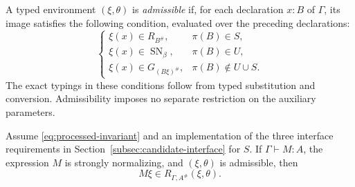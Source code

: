 A typed environment $(\xi,\theta)$ is \emph{admissible} if, for each
declaration $x:B$ of $\Gamma$, its image satisfies the following
condition, evaluated over the preceding declarations:
\[
 \begin{cases}
 \xi(x)\in R_{B^\#},&\pi(B)\in S,\\
 \xi(x)\in\operatorname{SN}_\beta,&\pi(B)\in U,\\
 \xi(x)\in G_{(B\xi)^\#},&\pi(B)\notin U\cup S.
 \end{cases}
\]
The exact typings in these conditions follow from typed substitution
and conversion. Admissibility imposes no separate restriction on the
auxiliary parameters.

\begin{lemma}
\label{lem:sn-fundamental}
Assume \eqref{eq:processed-invariant} and an implementation of
the three interface requirements in Section~\ref{subsec:candidate-interface}
for $S$. If $\Gamma\vdash M:A$, the expression $M$ is strongly
normalizing, and $(\xi,\theta)$ is admissible, then
\begin{equation}
                         M\xi\in R_{\Gamma,A^\#}(\xi,\theta).
\label{eq:sn-fundamental}
\end{equation}
\end{lemma}

